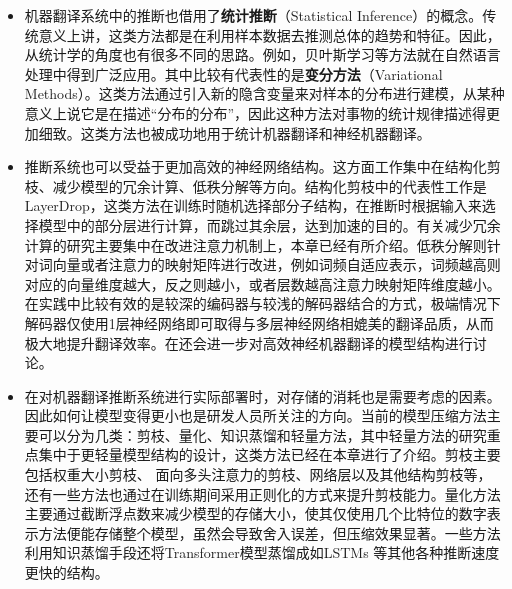 \begin{itemize}
\vspace{0.5em}
\item 机器翻译系统中的推断也借用了{\small\sffamily\bfseries{统计推断}}（Statistical Inference）的概念。传统意义上讲，这类方法都是在利用样本数据去推测总体的趋势和特征。因此，从统计学的角度也有很多不同的思路。例如，贝叶斯学习等方法就在自然语言处理中得到广泛应用。其中比较有代表性的是{\small\sffamily\bfseries{变分方法}}（Variational Methods）。这类方法通过引入新的隐含变量来对样本的分布进行建模，从某种意义上说它是在描述“分布的分布”，因此这种方法对事物的统计规律描述得更加细致。这类方法也被成功地用于统计机器翻译和神经机器翻译。
\vspace{0.5em}
\item 推断系统也可以受益于更加高效的神经网络结构。这方面工作集中在结构化剪枝、减少模型的冗余计算、低秩分解等方向。结构化剪枝中的代表性工作是LayerDrop，这类方法在训练时随机选择部分子结构，在推断时根据输入来选择模型中的部分层进行计算，而跳过其余层，达到加速的目的。有关减少冗余计算的研究主要集中在改进注意力机制上，本章已经有所介绍。低秩分解则针对词向量或者注意力的映射矩阵进行改进，例如词频自适应表示，词频越高则对应的向量维度越大，反之则越小，或者层数越高注意力映射矩阵维度越小。在实践中比较有效的是较深的编码器与较浅的解码器结合的方式，极端情况下解码器仅使用1层神经网络即可取得与多层神经网络相媲美的翻译品质，从而极大地提升翻译效率。在{\chapterfifteen}还会进一步对高效神经机器翻译的模型结构进行讨论。
\vspace{0.5em}
\item 在对机器翻译推断系统进行实际部署时，对存储的消耗也是需要考虑的因素。因此如何让模型变得更小也是研发人员所关注的方向。当前的模型压缩方法主要可以分为几类：剪枝、量化、知识蒸馏和轻量方法，其中轻量方法的研究重点集中于更轻量模型结构的设计，这类方法已经在本章进行了介绍。剪枝主要包括权重大小剪枝、 面向多头注意力的剪枝、网络层以及其他结构剪枝等，还有一些方法也通过在训练期间采用正则化的方式来提升剪枝能力。量化方法主要通过截断浮点数来减少模型的存储大小，使其仅使用几个比特位的数字表示方法便能存储整个模型，虽然会导致舍入误差，但压缩效果显著。一些方法利用知识蒸馏手段还将Transformer模型蒸馏成如LSTMs 等其他各种推断速度更快的结构。

\end{itemize}
